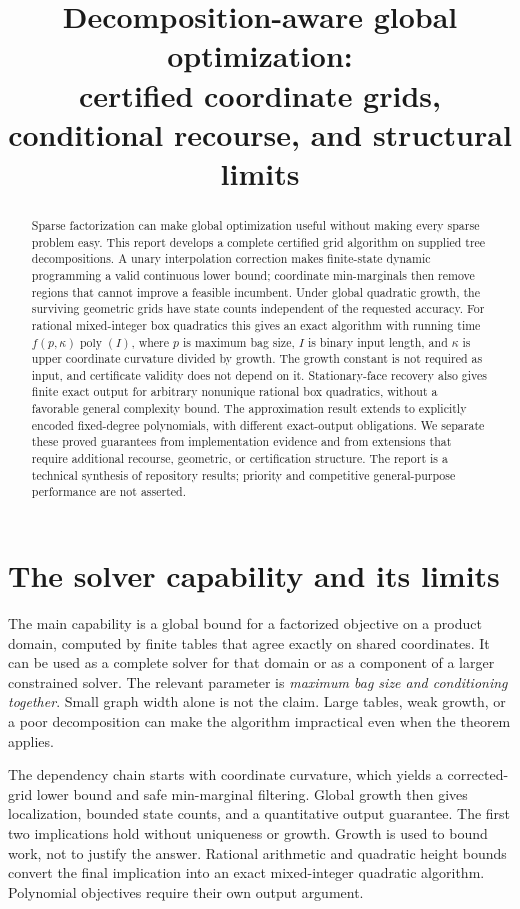 \documentclass[11pt]{article}
\title{Decomposition-aware global optimization:\\
certified coordinate grids, conditional recourse, and structural limits}
\author{}
\date{}
\theoremstyle{remark}
\newcommand{\poly}{\operatorname{poly}}
\begin{document}
\maketitle
\begin{abstract}
Sparse factorization can make global optimization useful without making
every sparse problem easy. This report develops a complete certified grid
algorithm on supplied tree decompositions. A unary interpolation correction
makes finite-state dynamic programming a valid continuous lower bound;
coordinate min-marginals then remove regions that cannot improve a feasible
incumbent. Under global quadratic growth, the surviving geometric grids
have state counts independent of the requested accuracy. For rational
mixed-integer box quadratics this gives an exact algorithm with running
time $f(p,\kappa)\poly(I)$, where $p$ is maximum bag size, $I$ is binary
input length, and $\kappa$ is upper coordinate curvature divided by growth.
The growth constant is not required as input, and certificate validity does
not depend on it. Stationary-face recovery also gives finite exact output
for arbitrary nonunique rational box quadratics, without a favorable
general complexity bound. The approximation result extends to explicitly encoded
fixed-degree polynomials, with different exact-output obligations. We
separate these proved guarantees from implementation evidence and from
extensions that require additional recourse, geometric, or certification
structure. The report is a technical synthesis of repository results;
priority and competitive general-purpose performance are not asserted.
\end{abstract}
\tableofcontents

\section{The solver capability and its limits}\label{sec:scope}

The main capability is a global bound for a factorized objective on a
product domain, computed by finite tables that agree exactly on shared
coordinates. It can be used as a complete solver for that domain or as a
component of a larger constrained solver. The relevant parameter is
\emph{maximum bag size and conditioning together}. Small graph width
alone is not the claim. Large tables, weak growth, or a poor decomposition
can make the algorithm impractical even when the theorem applies.

The dependency chain starts with coordinate curvature, which yields a
corrected-grid lower bound and safe min-marginal filtering. Global growth
then gives localization, bounded state counts, and a quantitative output
guarantee.
The first two implications hold without uniqueness or growth. Growth is
used to bound work, not to justify the answer. Rational arithmetic and
quadratic height bounds convert the final implication into an exact
mixed-integer quadratic algorithm. Polynomial objectives require their
own output argument.
\end{document}
